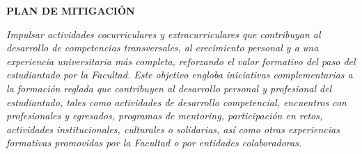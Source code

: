 \documentclass[11pt,a4paper]{scrreprt}
\begin{document}
\begin{tcolorbox}[mitbox]
{\footnotesize\sffamily\bfseries\color{green!40!black} PLAN DE MITIGACI\'ON}\par{}
\end{tcolorbox}
\vspace{8pt}

\newpage
{}
{\small\color{mutedcolor}\itshape Impulsar actividades cocurriculares y extracurriculares que contribuyan al desarrollo de competencias transversales, al crecimiento personal y a una experiencia universitaria más completa, reforzando el valor formativo del paso del estudiantado por la Facultad. Este objetivo engloba iniciativas complementarias a la formación reglada que contribuyen al desarrollo personal y profesional del estudiantado, tales como actividades de desarrollo competencial, encuentros con profesionales y egresados, programas de mentoring, participación en retos, actividades institucionales, culturales o solidarias, así como otras experiencias formativas promovidas por la Facultad o por entidades colaboradoras.}\par\vspace{6pt}
\end{document}
